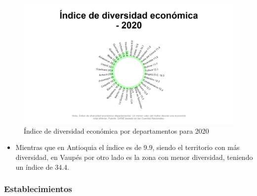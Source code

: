     \begin{figure}[H]
        \caption{Índice de diversidad económica por departamentos para 2020 \label{map_result_2} }
        \begin{center}
        \includegraphics[width=\textwidth,keepaspectratio]{img/var_300_static.png}
        \end{center}
    \end{figure}
            \begin{itemize}
                    \item Mientras que en Antioquia el índice es de 9.9, siendo el territorio con más diversidad, en Vaupés por otro lado es la zona con menor diversidad, teniendo un índice de 34.4.
                    \end{itemize}

        \subsubsection{Establecimientos}

